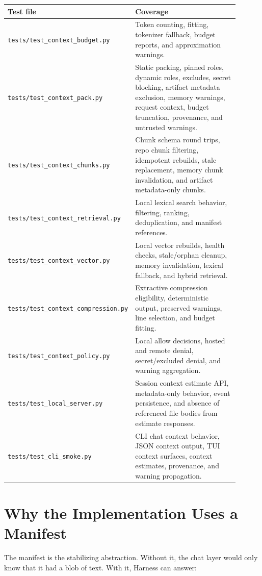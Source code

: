 \documentclass[11pt]{article}
\begin{document}
\begin{longtable}{p{0.34\linewidth}p{0.56\linewidth}}
\toprule
\textbf{Test file} & \textbf{Coverage} \\
\midrule
\texttt{tests/test\_context\_budget.py} & Token counting, fitting, tokenizer fallback, budget reports, and approximation warnings. \\
\texttt{tests/test\_context\_pack.py} & Static packing, pinned roles, dynamic roles, excludes, secret blocking, artifact metadata exclusion, memory warnings, request context, budget truncation, provenance, and untrusted warnings. \\
\texttt{tests/test\_context\_chunks.py} & Chunk schema round trips, repo chunk filtering, idempotent rebuilds, stale replacement, memory chunk invalidation, and artifact metadata-only chunks. \\
\texttt{tests/test\_context\_retrieval.py} & Local lexical search behavior, filtering, ranking, deduplication, and manifest references. \\
\texttt{tests/test\_context\_vector.py} & Local vector rebuilds, health checks, stale/orphan cleanup, memory invalidation, lexical fallback, and hybrid retrieval. \\
\texttt{tests/test\_context\_compression.py} & Extractive compression eligibility, deterministic output, preserved warnings, line selection, and budget fitting. \\
\texttt{tests/test\_context\_policy.py} & Local allow decisions, hosted and remote denial, secret/excluded denial, and warning aggregation. \\
\texttt{tests/test\_local\_server.py} & Session context estimate API, metadata-only behavior, event persistence, and absence of referenced file bodies from estimate responses. \\
\texttt{tests/test\_cli\_smoke.py} & CLI chat context behavior, JSON context output, TUI context surfaces, context estimates, provenance, and warning propagation. \\
\bottomrule
\end{longtable}

\section{Why the Implementation Uses a Manifest}

The manifest is the stabilizing abstraction. Without it, the chat layer would only know that it had a blob of text. With it, Harness can answer:
\end{document}
